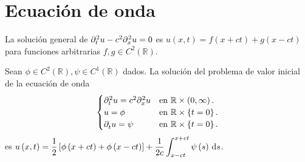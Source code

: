 \section{Ecuación de onda}

\begin{theorem}
	La solución general de
	\begin{math}
		\difcp[2]{u}{t}-
		c^{2}\difcp[2]{u}{x}=
		0
	\end{math}
	es
	\begin{math}
		u\left(x,t\right)=
		f\left(x+ct\right)+
		g\left(x-ct\right)
	\end{math}
	para funciones arbitrarias
	\begin{math}
		f,g\in
		C^{2}\left(\mathbb{R}\right)
	\end{math}.
\end{theorem}

\begin{theorem}
	Sean
	\begin{math}
		\phi\in
		C^{2}\left(\mathbb{R}\right),
		\psi\in
		C^{1}\left(\mathbb{R}\right)
	\end{math}
	dados.
	La solución del problema de valor inicial de la ecuación de onda
	\begin{equation*}
		\begin{cases}
			\difcp[2]{u}{t}=
			c^{2}\difcp[2]{u}{x} &
			\text{en }\mathbb{R}\times\left(0,\infty\right). \\
			u=\phi               &
			\text{en }\mathbb{R}\times\left\{t=0\right\}.    \\
			\difcp{u}{t}=\psi    &
			\text{en }\mathbb{R}\times\left\{t=0\right\}.
		\end{cases}
	\end{equation*}
	es
	\begin{math}\displaystyle
		u\left(x,t\right)=
		\frac{1}{2}
		\left[
			\phi\left(x+ct\right)+
			\phi\left(x-ct\right)
			\right]+
		\frac{1}{2c}
		\int_{x-ct}^{x+ct}
		\psi\left(s\right)\dl s
	\end{math}.
\end{theorem}

